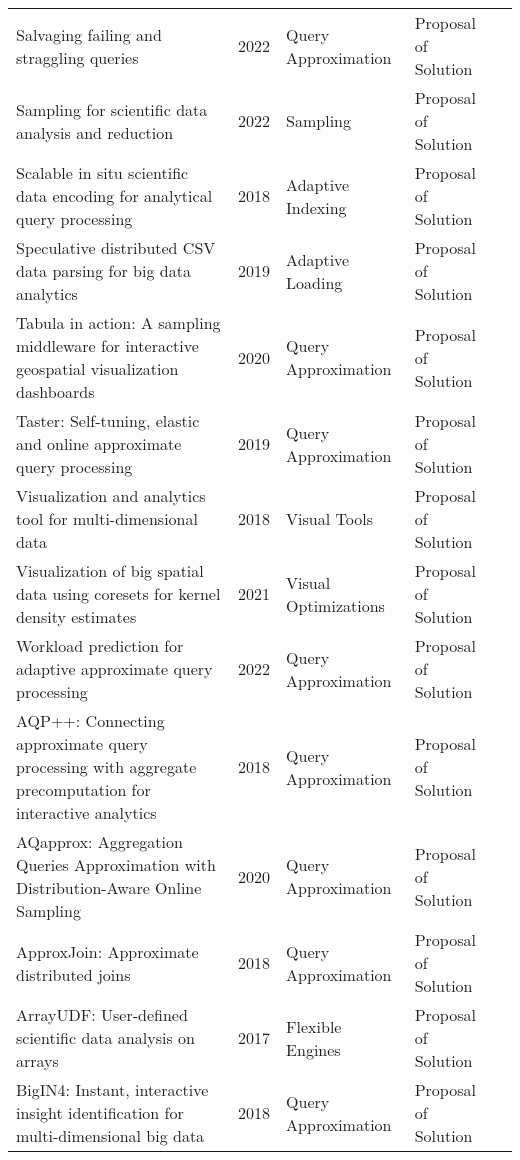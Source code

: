 \begin{longtable}{p{18em} l l l l}
Salvaging failing and straggling queries & 2022 & Query Approximation & Proposal of Solution & \cite{sundarmurthy_salvaging_2022}\\ 
Sampling for scientific data analysis and reduction & 2022 & Sampling & Proposal of Solution & \cite{10.1007/978-3-030-81627-8_2}\\ 
Scalable in situ scientific data encoding for analytical query processing & 2018 & Adaptive Indexing & Proposal of Solution & \cite{10.1145/2462902.2465527}\\ 
Speculative distributed {CSV} data parsing for big data analytics & 2019 & Adaptive Loading & Proposal of Solution & \cite{10.1145/3299869.3319898}\\ 
Tabula in action: {A} sampling middleware for interactive geospatial visualization dashboards & 2020 & Query Approximation & Proposal of Solution & \cite{10.14778/3415478.3415510}\\ 
Taster: {Self}-tuning, elastic and online approximate query processing & 2019 & Query Approximation & Proposal of Solution & \cite{8731505}\\ 
Visualization and analytics tool for multi-dimensional data & 2018 & Visual Tools & Proposal of Solution & \cite{10.1145/3206157.3206159}\\ 
Visualization of big spatial data using coresets for kernel density estimates & 2021 & Visual Optimizations & Proposal of Solution & \cite{8701576}\\ 
Workload prediction for adaptive approximate query processing & 2022 & Query Approximation & Proposal of Solution & \cite{10020614}\\ 
{AQP}++: {Connecting} approximate query processing with aggregate precomputation for interactive analytics & 2018 & Query Approximation & Proposal of Solution & \cite{10.1145/3183713.3183747}\\ 
{AQapprox}: {Aggregation} {Queries} {Approximation} with {Distribution}-{Aware} {Online} {Sampling} & 2020 & Query Approximation & Proposal of Solution & \cite{wu_aqapprox_2020}\\ 
{ApproxJoin}: {Approximate} distributed joins & 2018 & Query Approximation & Proposal of Solution & \cite{10.1145/3267809.3267834}\\ 
{ArrayUDF}: {User}-defined scientific data analysis on arrays & 2017 & Flexible Engines & Proposal of Solution & \cite{10.1145/3078597.3078599}\\ 
{BigIN4}: {Instant}, interactive insight identification for multi-dimensional big data & 2018 & Query Approximation & Proposal of Solution & \cite{10.1145/3219819.3219867}\\ 

\end{longtable}
